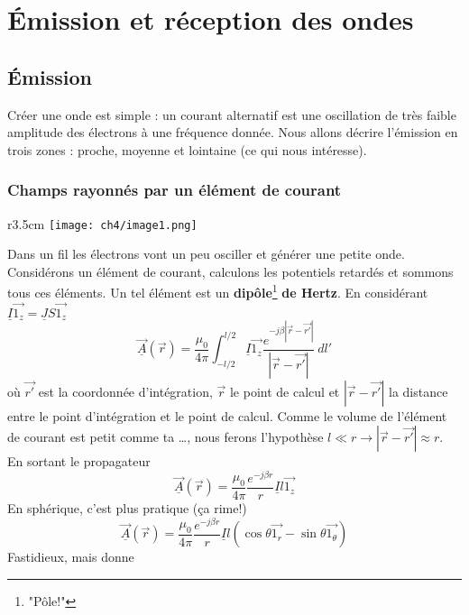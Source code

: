 \chapter{Émission et réception des ondes}
\section{Émission}
Créer une onde est simple : un courant alternatif est une oscillation de très faible 
amplitude des électrons à une fréquence donnée. Nous allons décrire l'émission en 
trois zones : proche, moyenne et lointaine (ce qui nous intéresse).

	\subsection{Champs rayonnés par un élément de courant}
	\begin{wrapfigure}[5]{r}{3.5cm}
	\vspace{-20mm}
	\texttt{[image: ch4/image1.png]}
	\end{wrapfigure}
	Dans un fil les électrons vont un peu osciller et générer une petite onde. 
	Considérons un élément de courant, calculons les potentiels retardés et 
	sommons tous ces éléments. Un tel élément est un \textbf{dipôle}\footnote{"Pôle!"} 
	\textbf{de Hertz}. En considérant $\underline{I}\vec{1_z} = \underline{J}S\vec{1_z}$ 
	\begin{equation}
	\underline{\vec{A}}(\vec{r}) = \dfrac{\mu_0}{4\pi}\int_{-l/2}^{l/2} 
	\underline{I}\vec{1_z} \dfrac{e^{-j\beta|\vec{r}-\vec{r'}|}}{|\vec{r}-\vec{r'}|}\ dl'
	\end{equation}
	où $\vec{r'}$ est la coordonnée d'intégration, $\vec{r}$ le point de calcul et 
	$|\vec{r}-\vec{r'}|$ la distance entre le point d'intégration et le point de calcul.
	Comme le volume de l'élément de courant est petit comme ta \dots, nous ferons 
	l'hypothèse $l\ll r \rightarrow |\vec{r}-\vec{r'}| \approx r$. En sortant le propagateur
	\begin{equation}
	\underline{\vec{A}}(\vec{r}) = \dfrac{\mu_0}{4\pi}\dfrac{e^{-j\beta r}}{r}\underline{I}l
	\vec{1_z}
	\end{equation}
	En sphérique, c'est plus pratique (ça rime!)
	\begin{equation}
	\underline{\vec{A}}(\vec{r}) = \dfrac{\mu_0}{4\pi}\dfrac{e^{-j\beta r}}{r}\underline{I}l
	\left(\cos\theta\vec{1_r}-\sin\theta\vec{1_\theta}\right)
	\end{equation}
	Fastidieux, mais donne
